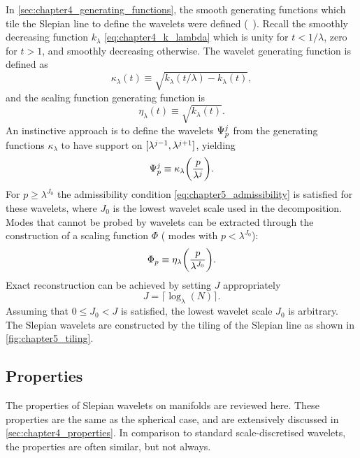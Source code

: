 In \cref{sec:chapter4_generating_functions}, the smooth generating functions which tile the Slepian line to define the wavelets were defined (\cf{}~\cite{Wiaux2008}).
Recall the smoothly decreasing function \(k_{\lambda}\) \cref{eq:chapter4_k_lambda} which is unity for \(t < 1/\lambda{}\), zero for \(t > 1\), and smoothly decreasing otherwise.
The wavelet generating function is defined as
%
\begin{equation}
	\kappa_{\lambda}(t)
	\equiv \sqrt{k_{\lambda}(t/\lambda) - k_{\lambda}(t)},
\end{equation}
%
and the scaling function generating function is
%
\begin{equation}
	\eta_{\lambda}(t)
	\equiv \sqrt{k_{\lambda}(t)}.
\end{equation}
%
An instinctive approach is to define the wavelets \({\Psi}_{p}^{j}\) from the generating functions \(\kappa_{\lambda}\) to have support on \(\interval{\lambda^{j-1}}{\lambda^{j+1}}\), yielding
%
\begin{equation}
	{\Psi}_{p}^{j}
	\equiv \kappa_{\lambda}\bigg(\frac{p}{\lambda^{j}}\bigg).
\end{equation}
%
For \(p \geq \lambda^{J_{0}}\) the admissibility condition \cref{eq:chapter5_admissibility} is satisfied for these wavelets, where \(J_{0}\) is the lowest wavelet scale used in the decomposition.
Modes that cannot be probed by wavelets can be extracted through the construction of a scaling function \(\Phi{}\) (\ie{} modes with \(p < \lambda^{J_{0}}\)):
%
\begin{equation}
	{\Phi}_{p}
	\equiv \eta_{\lambda}\bigg(\frac{p}{\lambda^{J_{0}}}\bigg).
\end{equation}
%
Exact reconstruction can be achieved by setting \(J\) appropriately
%
\begin{equation}
	J = \lceil{} \log_{\lambda}(N)\rceil{}.
\end{equation}
%
Assuming that \(0 \leq J_{0} < J\) is satisfied, the lowest wavelet scale \(J_{0}\) is arbitrary.
The Slepian wavelets are constructed by the tiling of the Slepian line as shown in \cref{fig:chapter5_tiling}.



\subsection{Properties}\label{sec:chapter5_properties}

The properties of Slepian wavelets on manifolds are reviewed here.
These properties are the same as the spherical case, and are extensively discussed in \cref{sec:chapter4_properties}.
In comparison to standard scale-discretised wavelets, the properties are often similar, but not always.


